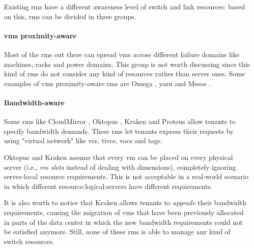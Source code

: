 Existing \glspl{rm} have a different awareness level of switch and link resources: based on this, \glspl{rm} can be divided in three groups.

\paragraph{\glspl{vm} proximity-aware}
Most of the \glspl{rm} out there can spread \glspl{vm} across different failure domains like machines, racks and power domains.
This group is not worth discussing since this kind of \glspl{rm} do not consider any kind of resources rather than server ones.
Some examples of \glspl{vm} proximity-aware \glspl{rm} are Omega \cite{omega}, \glsdesc{yarn} and Mesos \cite{mesos}.

\paragraph{Bandwidth-aware}
   
Some \glspl{rm} like CloudMirror \cite{cloudmirror}, Oktopus \cite{oktopus}, Kraken \cite{kraken} and Proteus \cite{proteus} allow tenants to specify bandwidth demands.
These \glspl{rm} let tenants express their requests by using "virtual network"  like \glspl{vc}, \glspl{tivc}, \glspl{voc} and \glspl{tag}.

Oktopus \cite{oktopus} and Kraken \cite{kraken} assume that every \gls{vm} can be placed on every physical server (i.e., \textit{\gls{vm} slots} instead of dealing with  dimensions), completely ignoring server-local resource requirements.
This is not acceptable in a real-world scenario in which different \glspl{resource:logical:server} have different  requirements.

It is also worth to notice that Kraken \cite{kraken} allows tenants to \textit{upgrade} their bandwidth requirements, causing the migration of \glspl{vm} that have been previously allocated in parts of the data center in which the new bandwidth requirements could not be satisfied anymore.
Still, none of these \glspl{rm} is able to manage any kind of switch resources.

